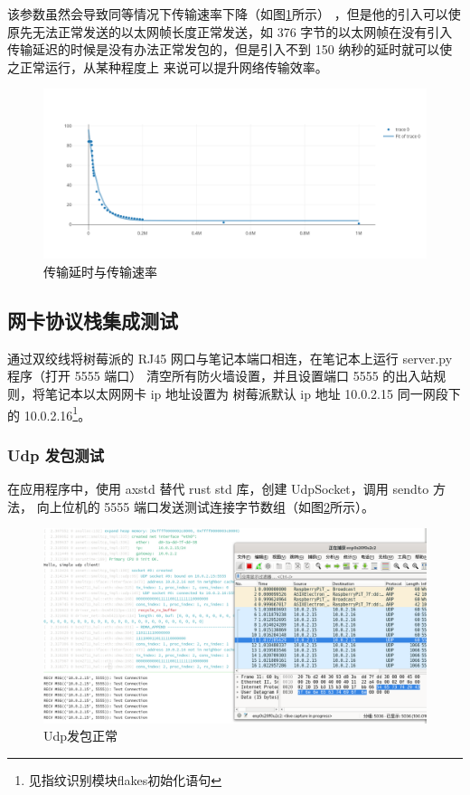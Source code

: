     该参数虽然会导致同等情况下传输速率下降（如图\ref{test::传输延时与发送速率}所示）
    ，但是他的引入可以使原先无法正常发送的以太网帧长度正常发送，如 376 字节的以太网帧在没有引入
    传输延迟的时候是没有办法正常发包的，但是引入不到 150 纳秒的延时就可以使之正常运行，从某种程度上
    来说可以提升网络传输效率。

    \begin{figure}[ht]
        \centering
        \caption{传输延时与传输速率}    \label{test::传输延时与发送速率}
        \includegraphics[width=\textwidth]{./imgs/测试-传输延时与发送速率.png}
    \end{figure}   

    \subsection{网卡协议栈集成测试}

    通过双绞线将树莓派的 RJ45 网口与笔记本端口相连，在笔记本上运行 server.py 程序（打开 5555 端口）
    清空所有防火墙设置，并且设置端口 5555 的出入站规则，将笔记本以太网网卡 ip 地址设置为
    树莓派默认 ip 地址 10.0.2.15 同一网段下的 10.0.2.16\footnote{见指纹识别模块flakes初始化语句}。

    \subsubsection{Udp 发包测试}

    在应用程序中，使用 axstd 替代 rust std 库，创建 UdpSocket，调用 sendto 方法，
    向上位机的 5555 端口发送测试连接字节数组（如图\ref{test::Udp发包}所示）。

    \begin{figure}[ht]
        \centering
        \caption{Udp发包正常}    \label{test::Udp发包}
        \includegraphics[width=\textwidth]{./imgs/测试-udp发包正常.png}
    \end{figure}   

